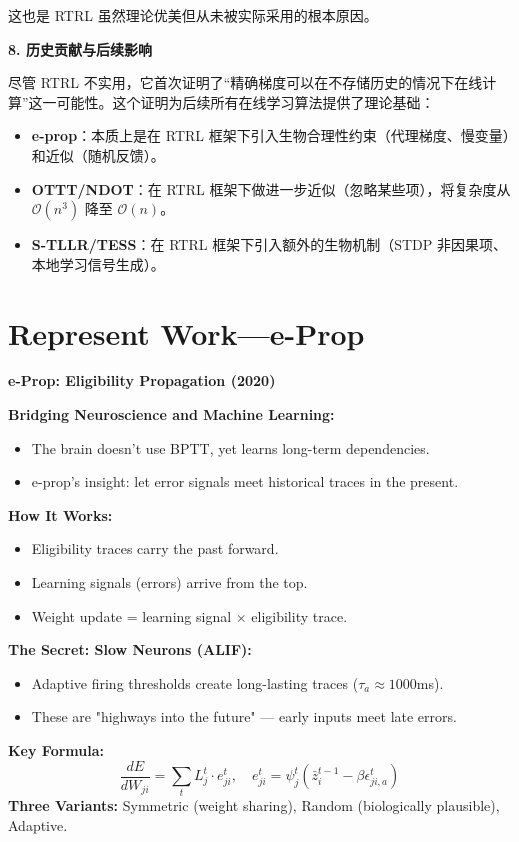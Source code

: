 \documentclass[journal,12pt,onecolumn]{IEEEtran}
\begin{document}
这也是 RTRL 虽然理论优美但从未被实际采用的根本原因。

\medskip\noindent\textbf{8. 历史贡献与后续影响}

尽管 RTRL 不实用，它首次证明了“精确梯度可以在不存储历史的情况下在线计算”这一可能性。这个证明为后续所有在线学习算法提供了理论基础：
\begin{itemize}
    \item \textbf{e-prop}：本质上是在 RTRL 框架下引入生物合理性约束（代理梯度、慢变量）和近似（随机反馈）。
    \item \textbf{OTTT/NDOT}：在 RTRL 框架下做进一步近似（忽略某些项），将复杂度从 $\mathcal{O}(n^3)$ 降至 $\mathcal{O}(n)$。
    \item \textbf{S-TLLR/TESS}：在 RTRL 框架下引入额外的生物机制（STDP 非因果项、本地学习信号生成）。
\end{itemize}


\section{Represent Work—e-Prop}

\bigskip\noindent\textbf{e-Prop: Eligibility Propagation (2020)}\par\smallskip
\textbf{Bridging Neuroscience and Machine Learning:}
\begin{itemize}
    \item The brain doesn't use BPTT, yet learns long-term dependencies.
    \item e-prop's insight: let error signals meet historical traces in the present.
\end{itemize}
\textbf{How It Works:}
\begin{itemize}
    \item Eligibility traces carry the past forward.
    \item Learning signals (errors) arrive from the top.
    \item Weight update = learning signal $\times$ eligibility trace.
\end{itemize}
\textbf{The Secret: Slow Neurons (ALIF):}
\begin{itemize}
    \item Adaptive firing thresholds create long-lasting traces ($\tau_a \approx 1000$ms).
    \item These are "highways into the future" — early inputs meet late errors.
\end{itemize}
\textbf{Key Formula:}
\begin{equation}
    \frac{dE}{dW_{ji}} = \sum_t L_j^t \cdot e_{ji}^t, \quad e_{ji}^t = \psi_j^t(\bar{z}_i^{t-1} - \beta \epsilon_{ji,a}^t)
\end{equation}
\textbf{Three Variants:} Symmetric (weight sharing), Random (biologically plausible), Adaptive.
\end{document}
